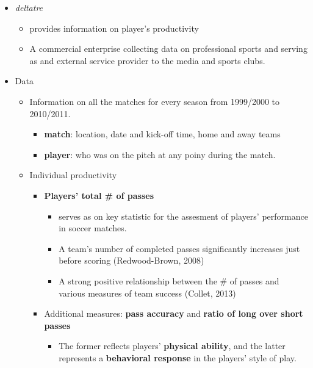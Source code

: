 \documentclass[../root]{subfiles}
\begin{document}
    \begin{itemize}
      \item \textit{deltatre}
      \begin{itemize}
        \item provides information on player's productivity
        \item A commercial enterprise collecting data on professional sports and serving as and external service provider to the media and sports clubs.
      \end{itemize}
      \item Data
      \begin{itemize}
        \item Information on all the matches for every season from 1999/2000 to 2010/2011.
        \begin{itemize}
          \item \textbf{match}: location, date and kick-off time, home and away teams
          \item \textbf{player}: who was on the pitch at any poiny during the match.
        \end{itemize}
        \item Individual productivity
        \begin{itemize}
          \item \textbf{Players' total \# of passes}
          \begin{itemize}
            \item serves as on key statistic for the assesment of players' performance in soccer matches.
            \item A team's number of completed passes significantly increases just before scoring (Redwood-Brown, 2008)
            \item A strong positive relationship between the \# of passes and various measures of team success (Collet, 2013)
          \end{itemize}
          \item Additional measures: \textbf{pass accuracy} and \textbf{ratio of long over short passes}
          \begin{itemize}
            \item The former reflects players' \textbf{physical ability}, and the latter represents a \textbf{behavioral response} in the players' style of play.
          \end{itemize}
        \end{itemize}
      \end{itemize}
    \end{itemize}
\end{document}

